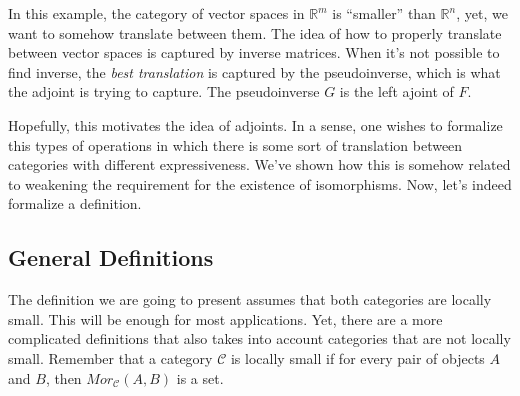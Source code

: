 In this example, the category of vector spaces in $\mathbb R^m$ is ``smaller''
than $\mathbb R^n$, yet, we want to somehow translate between them. The idea
of how to properly translate between vector spaces is captured
by inverse matrices. When it's not possible to find inverse, the \textit{best translation}
is captured by the pseudoinverse, which is what the adjoint is trying to capture.
The pseudoinverse $G$ is the left ajoint of $F$.

Hopefully, this motivates the idea of adjoints. In a sense, one wishes to
formalize this types of operations in which there is some sort of translation
between categories with different expressiveness. We've shown how this is somehow
related to weakening the requirement for the existence of isomorphisms.
Now, let's indeed formalize a definition.





\subsection{General Definitions}

The definition we are going to present assumes that both categories are locally small. This will
be enough for most applications. Yet, there are a more complicated definitions that also takes into
account categories that are not locally small. Remember that a category $\mathcal C$
is locally small if for every pair of objects $A$ and $B$, then $Mor_\mathcal C (A,B)$ is a set.

